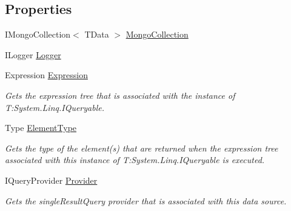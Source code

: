 \subsection*{Properties}
\begin{DoxyCompactItemize}
\item 
I\+Mongo\+Collection$<$ T\+Data $>$ \hyperlink{classCqrs_1_1MongoDB_1_1DataStores_1_1MongoDbDataStore_a116162a1c8e20706e99e850b0a9718cc_a116162a1c8e20706e99e850b0a9718cc}{Mongo\+Collection}
\item 
I\+Logger \hyperlink{classCqrs_1_1MongoDB_1_1DataStores_1_1MongoDbDataStore_a1258497689d7f866b2bc219cd8268b7d_a1258497689d7f866b2bc219cd8268b7d}{Logger}
\item 
Expression \hyperlink{classCqrs_1_1MongoDB_1_1DataStores_1_1MongoDbDataStore_ade387c1d511dfad22ff7eb752fb842e5_ade387c1d511dfad22ff7eb752fb842e5}{Expression}
\begin{DoxyCompactList}\small\item\em Gets the expression tree that is associated with the instance of T\+:\+System.\+Linq.\+I\+Queryable. \end{DoxyCompactList}\item 
Type \hyperlink{classCqrs_1_1MongoDB_1_1DataStores_1_1MongoDbDataStore_a54f5798a67d64a47e6acb15f378fb246_a54f5798a67d64a47e6acb15f378fb246}{Element\+Type}
\begin{DoxyCompactList}\small\item\em Gets the type of the element(s) that are returned when the expression tree associated with this instance of T\+:\+System.\+Linq.\+I\+Queryable is executed. \end{DoxyCompactList}\item 
I\+Query\+Provider \hyperlink{classCqrs_1_1MongoDB_1_1DataStores_1_1MongoDbDataStore_ab08ce716944d76cbaef9a94fd1525440_ab08ce716944d76cbaef9a94fd1525440}{Provider}
\begin{DoxyCompactList}\small\item\em Gets the single\+Result\+Query provider that is associated with this data source. \end{DoxyCompactList}\end{DoxyCompactItemize}


